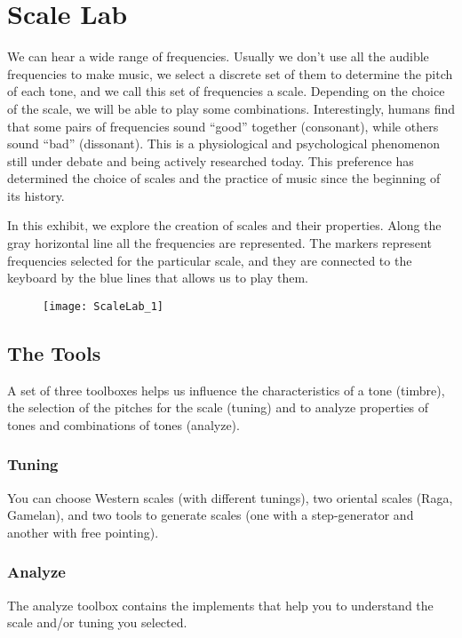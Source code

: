 \section{Scale Lab}
We can hear a wide range of frequencies. Usually we don't use all the audible frequencies to make music, we select a discrete set of them to determine the pitch of each tone, and we call this set of frequencies a scale. Depending on the choice of the scale, we will be able to play some combinations. Interestingly, humans find that some pairs of frequencies sound ``good'' together (consonant), while others sound ``bad'' (dissonant). This is a physiological and psychological phenomenon still under debate and being actively researched today. This preference has determined the choice of scales and the practice of music since the beginning of its history.

In this exhibit, we explore the creation of scales and their properties. Along the gray horizontal line all the frequencies are represented. The markers represent frequencies selected for the particular  scale, and they are connected to the keyboard by the blue lines that allows us to play them. 

\begin{figure}[h]
\centering
\texttt{[image: ScaleLab\_1]}
\end{figure}

\subsection{The Tools}
A set of three toolboxes helps us influence the characteristics of a tone (timbre), the selection of the pitches for the scale (tuning) and to analyze properties of tones and combinations of tones (analyze).

\subsubsection{Tuning}
You can choose Western scales (with different tunings), two oriental scales (Raga, Gamelan), and two tools to generate scales (one with a step-generator and another with free pointing).

\subsubsection{Analyze}
The analyze toolbox contains the implements that help you to understand the scale and/or tuning you selected.


